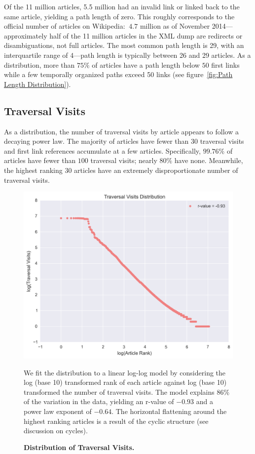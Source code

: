 \documentclass[pre,twocolumn,twoside,superscriptaddress,floatfix, aps, 10pt]{revtex4-1}
\begin{document}
Of the 11 million articles, 5.5 million had an invalid link or linked back to the same article, yielding a path length of zero. 
This roughly corresponds to the official number of articles on Wikipedia: 
$~4.7$ million as of November 2014---approximately half of the 11 million 
articles in the XML dump are redirects or disambiguations, not full articles.
The most common path length is 29, with an interquartile range of 4---path length
is typically between 26 and 29 articles.
As a distribution, more than $75\%$ of articles have a path length below 
$50$ first links 
while a few temporally organized paths exceed 50 links 
(see figure~\ref{fig:Path Length Distribution}). 



\subsection{Traversal Visits}

As a distribution, the number of traversal visits by article appears to follow a decaying power law. 
The majority of articles have fewer than 30 traversal visits and
first link references accumulate at a few articles.
Specifically, $99.76\%$ of articles have fewer than $100$ traversal visits; nearly $80\%$ have none. 
Meanwhile, the highest ranking 30 articles have an extremely disproportionate number of traversal visits.

\begin{figure}[tp!]
  \centering	
  \includegraphics[width=\columnwidth]{graphics/traversals_per_article.png} 
  \caption{
    \textbf{Distribution of Traversal Visits.}
  }
  We fit the distribution to a linear log-log model by considering the log (base 10) transformed rank of each article against log (base 10) transformed the number of traversal visits. 
  The model explains $86\%$ of the variation in the data, yielding an r-value of $-0.93$ 
  and a power law exponent of $-0.64$. The horizontal flattening around the highest
  ranking articles is a result of the cyclic structure (see discussion on cycles).
  \label{fig:Distribution of Visits}

\end{figure}
\end{document}
